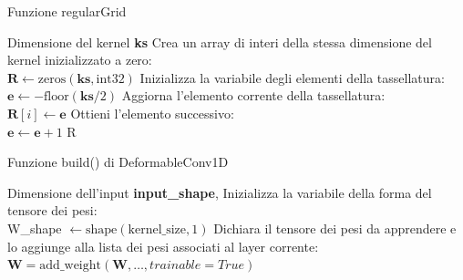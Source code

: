 \documentclass[12pt,a4paper]{report}
\begin{document}
    \begin{algorithm}[t]
        \caption{Funzione regularGrid}
        \begin{algorithmic} \label{alg:reggrid}
            \REQUIRE Dimensione del kernel \textbf{ks}
            \STATE Crea un array di interi della stessa dimensione del kernel 
            inizializzato a zero: \\\quad$\boldsymbol{R}\gets
            \text{zeros}(\boldsymbol{ks}, \text{int32})$
            \STATE Inizializza la variabile degli elementi della tassellatura:\\ 
            \quad$\boldsymbol{e}\gets-\text{floor}(\boldsymbol{ks}/2)$
                \STATE Aggiorna l'elemento corrente della tassellatura:\\
                \quad$\boldsymbol{R}[i]\gets \boldsymbol{e}$
                \STATE Ottieni l'elemento successivo:\\
                \quad$\boldsymbol{e}\gets \boldsymbol{e}+1$
            \ENDFOR
            \RETURN R
        \end{algorithmic}
    \end{algorithm}

    \begin{algorithm}[t] 
        \caption{Funzione build() di DeformableConv1D}
        \begin{algorithmic} \label{alg:defbuild}
            \REQUIRE Dimensione dell'input \textbf{input\_shape},
            \STATE Inizializza la variabile della forma del tensore dei pesi:\\
            \quad W\_shape $\gets\text{shape}(\text{kernel\_size}, 1)$
            \STATE Dichiara il tensore dei pesi da apprendere e lo aggiunge alla 
            lista dei pesi associati al layer corrente:\\
            \quad$\boldsymbol{W}=\text{add\_weight}(\boldsymbol{W},
            \dots,trainable=True)$
        \end{algorithmic}
    \end{algorithm}
\end{document}
